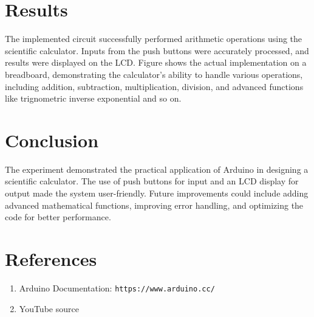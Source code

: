 \documentclass[journal]{IEEEtran}
\begin{document}
\section{Results}
The implemented circuit successfully performed arithmetic operations using the scientific calculator. Inputs from the push buttons were accurately processed, and results were displayed on the LCD. Figure shows the actual implementation on a breadboard, demonstrating the calculator's ability to handle various operations, including addition, subtraction, multiplication, division, and advanced functions like trignometric inverse exponential and so on.

\section{Conclusion}
The experiment demonstrated the practical application of Arduino in designing a scientific calculator. The use of push buttons for input and an LCD display for output made the system user-friendly. Future improvements could include adding advanced mathematical functions, improving error handling, and optimizing the code for better performance.


\section{References}
\begin{enumerate}
\item Arduino Documentation: \texttt{https://www.arduino.cc/}
\item YouTube source
\end{enumerate}
\end{document}
